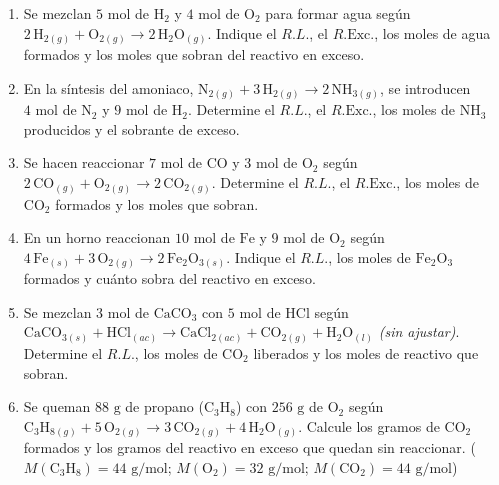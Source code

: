 \documentclass[12pt, letterpaper]{article}
\begin{document}
\begin{enumerate}[leftmargin=*, start=25]

  \item \medio{}\hspace{0.55em}Se mezclan $5\text{ mol}$ de $\text{H}_2$ y $4\text{ mol}$ de $\text{O}_2$ para formar agua según $2\,\text{H}_{2(g)} + \text{O}_{2(g)} \longrightarrow 2\,\text{H}_2\text{O}_{(g)}$. Indique el $R.L.$, el $R.\text{Exc.}$, los moles de agua formados y los moles que sobran del reactivo en exceso.

  \item \medio{}\hspace{0.55em}En la síntesis del amoniaco, $\text{N}_{2(g)} + 3\,\text{H}_{2(g)} \longrightarrow 2\,\text{NH}_{3(g)}$, se introducen $4\text{ mol}$ de $\text{N}_2$ y $9\text{ mol}$ de $\text{H}_2$. Determine el $R.L.$, el $R.\text{Exc.}$, los moles de $\text{NH}_3$ producidos y el sobrante de exceso.

  \item \medio{}\hspace{0.55em}Se hacen reaccionar $7\text{ mol}$ de $\text{CO}$ y $3\text{ mol}$ de $\text{O}_2$ según $2\,\text{CO}_{(g)} + \text{O}_{2(g)} \longrightarrow 2\,\text{CO}_{2(g)}$. Determine el $R.L.$, el $R.\text{Exc.}$, los moles de $\text{CO}_2$ formados y los moles que sobran.

  \item \medio{}\hspace{0.55em}En un horno reaccionan $10\text{ mol}$ de $\text{Fe}$ y $9\text{ mol}$ de $\text{O}_2$ según $4\,\text{Fe}_{(s)} + 3\,\text{O}_{2(g)} \longrightarrow 2\,\text{Fe}_2\text{O}_{3(s)}$. Indique el $R.L.$, los moles de $\text{Fe}_2\text{O}_3$ formados y cuánto sobra del reactivo en exceso.

  \item \medio{}\hspace{0.55em}Se mezclan $3\text{ mol}$ de $\text{CaCO}_3$ con $5\text{ mol}$ de $\text{HCl}$ según $\text{CaCO}_{3(s)} + \text{HCl}_{(ac)} \longrightarrow \text{CaCl}_{2(ac)} + \text{CO}_{2(g)} + \text{H}_2\text{O}_{(l)}$ \emph{(sin ajustar)}. Determine el $R.L.$, los moles de $\text{CO}_2$ liberados y los moles de reactivo que sobran.

  \item \dificil{}\hspace{0.55em}Se queman $88\text{ g}$ de propano ($\text{C}_3\text{H}_8$) con $256\text{ g}$ de $\text{O}_2$ según $\text{C}_3\text{H}_{8(g)} + 5\,\text{O}_{2(g)} \longrightarrow 3\,\text{CO}_{2(g)} + 4\,\text{H}_2\text{O}_{(g)}$. Calcule los gramos de $\text{CO}_2$ formados y los gramos del reactivo en exceso que quedan sin reaccionar. ($M(\text{C}_3\text{H}_8) = 44\text{ g/mol}$; $M(\text{O}_2) = 32\text{ g/mol}$; $M(\text{CO}_2) = 44\text{ g/mol}$)


\end{enumerate}
\end{document}
